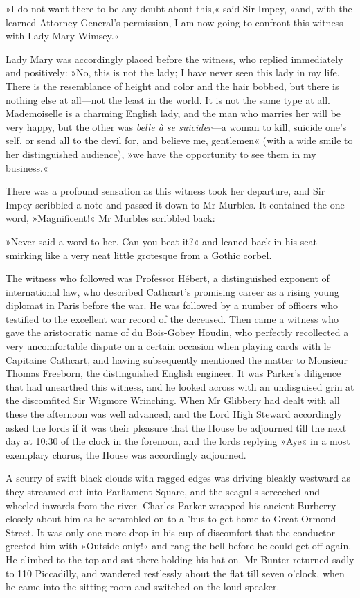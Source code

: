 »I do not want there to be any doubt about this,« said Sir Impey, »and, with the learned Attorney-General's permission, I am now going to confront this witness with Lady Mary Wimsey.«

Lady Mary was accordingly placed before the witness, who replied immediately and positively: »No, this is not the lady; I have never seen this lady in my life. There is the resemblance of height and color and the hair bobbed, but there is nothing else at all\allowbreak---\allowbreak not the least in the world. It is not the same type at all. Mademoiselle is a charming English lady, and the man who marries her will be very happy, but the other was \textit{belle à se suicider}---a woman to kill, suicide one's self, or send all to the devil for, and believe me, gentlemen« (with a wide smile to her distinguished audience), »we have the opportunity to see them in my business.«

There was a profound sensation as this witness took her departure, and Sir Impey scribbled a note and passed it down to Mr Murbles. It contained the one word, »Magnificent!« Mr Murbles scribbled back:

»Never said a word to her. Can you beat it?« and leaned back in his seat smirking like a very neat little grotesque from a Gothic corbel.

The witness who followed was Professor Hébert, a distinguished exponent of international law, who described Cathcart's promising career as a rising young diplomat in Paris before the war. He was followed by a number of officers who testified to the excellent war record of the deceased. Then came a witness who gave the aristocratic name of du Bois-Gobey Houdin, who perfectly recollected a very uncomfortable dispute on a certain occasion when playing cards with le Capitaine Cathcart, and having subsequently mentioned the matter to Monsieur Thomas Freeborn, the distinguished English engineer. It was Parker's diligence that had unearthed this witness, and he looked across with an undisguised grin at the discomfited Sir Wigmore Wrinching. When Mr  Glibbery had dealt with all these the afternoon was well advanced, and the Lord High Steward accordingly asked the lords if it was their pleasure that the House be adjourned till the next day at 10:30 of the clock in the forenoon, and the lords replying »Aye« in a most exemplary chorus, the House was accordingly adjourned.

A scurry of swift black clouds with ragged edges was driving bleakly westward as they streamed out into Parliament Square, and the seagulls screeched and wheeled inwards from the river. Charles Parker wrapped his ancient Burberry closely about him as he scrambled on to a 'bus to get home to Great Ormond Street. It was only one more drop in his cup of discomfort that the conductor greeted him with »Outside only!« and rang the bell before he could get off again. He climbed to the top and sat there holding his hat on. Mr Bunter returned sadly to 110 Piccadilly, and wandered restlessly about the flat till seven o'clock, when he came into the sitting-room and switched on the loud speaker.


